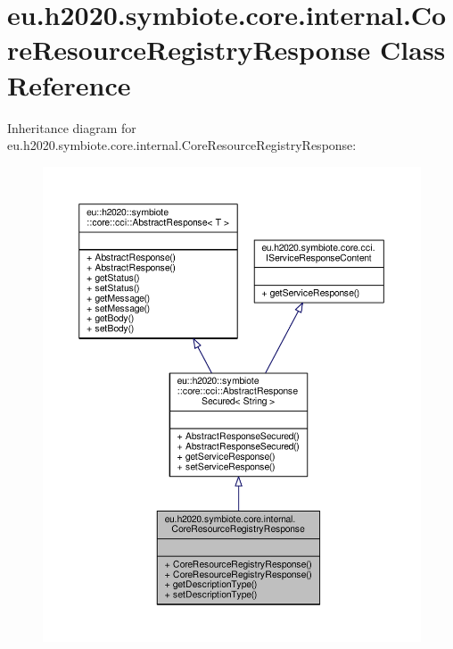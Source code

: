 \hypertarget{classeu_1_1h2020_1_1symbiote_1_1core_1_1internal_1_1CoreResourceRegistryResponse}{}\section{eu.\+h2020.\+symbiote.\+core.\+internal.\+Core\+Resource\+Registry\+Response Class Reference}
\label{classeu_1_1h2020_1_1symbiote_1_1core_1_1internal_1_1CoreResourceRegistryResponse}


Inheritance diagram for eu.\+h2020.\+symbiote.\+core.\+internal.\+Core\+Resource\+Registry\+Response\+:\nopagebreak
\begin{figure}[H]
\begin{center}
\leavevmode
\includegraphics[width=350pt]{classeu_1_1h2020_1_1symbiote_1_1core_1_1internal_1_1CoreResourceRegistryResponse__inherit__graph}
\end{center}
\end{figure}


